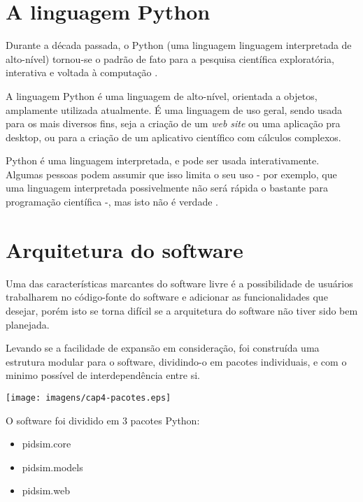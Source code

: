 \section{A linguagem Python}

    Durante a década passada, o Python \cite{Python} (uma linguagem linguagem interpretada
    de alto-nível) tornou-se o padrão de fato para a pesquisa científica
    exploratória, interativa e voltada à computação \cite{5725235}.
    
    A linguagem Python é uma linguagem de alto-nível, orientada a objetos,
    amplamente utilizada atualmente. É uma linguagem de uso geral, sendo
    usada para os mais diversos fins, seja a criação de um \textit{web site}
    ou uma aplicação pra desktop, ou para a criação de um aplicativo científico
    com cálculos complexos.
    
    Python é uma linguagem interpretada, e pode ser usada interativamente.
    Algumas pessoas podem assumir que isso limita o seu uso - por exemplo,
    que uma linguagem interpretada possivelmente não será rápida o bastante
    para programação científica -, mas isto não é verdade \cite{4160249}.

\section{Arquitetura do software}

    Uma das características marcantes do software livre é a possibilidade de
    usuários trabalharem no código-fonte do software e adicionar as funcionalidades
    que desejar, porém isto se torna difícil se a arquitetura do software não tiver
    sido bem planejada.

    Levando se a facilidade de expansão em consideração, foi construída uma estrutura
    modular para o software, dividindo-o em pacotes individuais, e com o minimo
    possível de interdependência entre si.
    
    \begin{center}
        \texttt{[image: imagens/cap4-pacotes.eps]}
    \end{center}
    
    O software foi dividido em 3 pacotes Python:

    \begin{itemize}
        \item pidsim.core
        \item pidsim.models
        \item pidsim.web
    \end{itemize}

